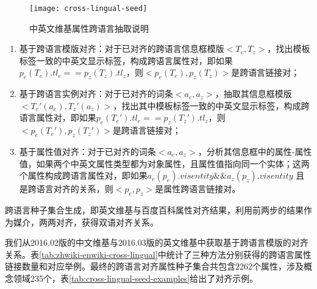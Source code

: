 \begin{figure}[h]
  \centering
    \texttt{[image: cross-lingual-seed]}
  \caption{中英文维基属性跨语言抽取说明}
  \label{fig:cross-lingual-seed}
\end{figure}

\begin{enumerate}[1)]
\item  {\heiti 基于跨语言模版对齐：}对于已对齐的跨语言信息框模版$<T_e, T_z>$，找出模板标签一致的中英文显示标签，构成跨语言属性对，即如果$p_e(T_e).tl_e == p_z(T_z).tl_z$，则$<p_e(T_e), p_z(T_z)>$是跨语言链接对；
\item  {\heiti 基于跨语言实例对齐：}对于已对齐的词条$<a_e, a_z>$，抽取其信息框模版$<T_e'(a_e), T_z'(a_z)>$，找出其中模板标签一致的中英文显示标签，构成跨语言属性对，即如果$p_e(T_e').tl_e == p_z(T_z').tl_z$，则$<p_e(T_e'), p_z(T_z')>$是跨语言链接对；
\item  {\heiti 基于属性值对齐：}对于已对齐的词条$<a_e, a_z>$，分析其信息框中的属性-属性值，如果两个中英文属性类型都为对象属性，且属性值指向同一个实体；这两个属性构成跨语言属性对，即如果$a_e(p_e).v is entity \&\& a_z(p_z).v is entity$ 且是跨语言对齐的关系，则$<p_e, p_z>$是属性跨语言链接对。
\end{enumerate}

{\heiti 跨语言种子集合生成}，即英文维基与百度百科属性对齐结果，利用前两步的结果作为媒介，两两对齐，获得双语对齐关系。

我们从2016.02版的中文维基与2016.03版的英文维基中获取基于跨语言模版的对齐关系。表\ref{tab:zhwiki-enwiki-cross-lingual}中统计了三种方法分别获得的跨语言属性链接数量和对应举例。最终的跨语言对齐属性种子集合共包含2262个属性，涉及概念领域235个，表\ref{tab:cross-lingual-seed-examples}给出了对齐示例。

